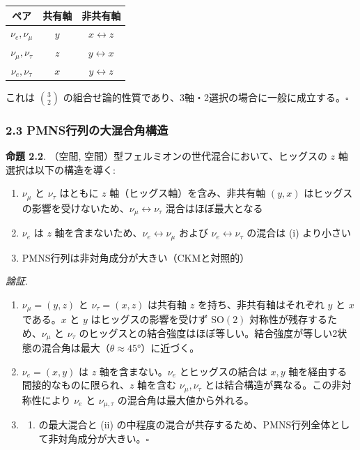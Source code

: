 \documentclass[
  a4paper,11pt]{ltjsarticle}
\newcounter{none} %
\providecommand{\tightlist}{%
  \setlength{\itemsep}{0pt}\setlength{\parskip}{0pt}}
\begin{document}
{\def\LTcaptype{none} %
\begin{longtable}[]{@{}ccc@{}}
\toprule\noalign{}
ペア & 共有軸 & 非共有軸 \\
\midrule\noalign{}
\endhead
\bottomrule\noalign{}
\endlastfoot
\(\nu_e, \nu_\mu\) & \(y\) & \(x \leftrightarrow z\) \\
\(\nu_\mu, \nu_\tau\) & \(z\) & \(y \leftrightarrow x\) \\
\(\nu_e, \nu_\tau\) & \(x\) & \(y \leftrightarrow z\) \\
\end{longtable}
}

これは \(\binom{3}{2}\)
の組合せ論的性質であり、3軸・2選択の場合に一般に成立する。\(\square\)

\subsubsection{2.3
PMNS行列の大混合角構造}\label{pmnsux884cux5217ux306eux5927ux6df7ux5408ux89d2ux69cbux9020}

\textbf{命題 2.2}. （空間,
空間）型フェルミオンの世代混合において、ヒッグスの \(z\)
軸選択は以下の構造を導く:

\begin{enumerate}
\def\labelenumi{(\roman{enumi})}
\item
  \(\nu_\mu\) と \(\nu_\tau\) はともに \(z\)
  軸（ヒッグス軸）を含み、非共有軸 \((y, x)\)
  はヒッグスの影響を受けないため、\(\nu_\mu \leftrightarrow \nu_\tau\)
  混合はほぼ最大となる
\item
  \(\nu_e\) は \(z\) 軸を含まないため、\(\nu_e \leftrightarrow \nu_\mu\)
  および \(\nu_e \leftrightarrow \nu_\tau\) の混合は (i) より小さい
\item
  PMNS行列は非対角成分が大きい（CKMと対照的）
\end{enumerate}

\emph{論証}.

\begin{enumerate}
\def\labelenumi{(\roman{enumi})}
\item
  \(\nu_\mu = (y, z)\) と \(\nu_\tau = (x, z)\) は共有軸 \(z\)
  を持ち、非共有軸はそれぞれ \(y\) と \(x\) である。\(x\) と \(y\)
  はヒッグスの影響を受けず \(\mathrm{SO}(2)\)
  対称性が残存するため、\(\nu_\mu\) と \(\nu_\tau\)
  のヒッグスとの結合強度はほぼ等しい。結合強度が等しい2状態の混合角は最大（\(\theta \approx 45°\)）に近づく。
\item
  \(\nu_e = (x, y)\) は \(z\) 軸を含まない。\(\nu_e\) とヒッグスの結合は
  \(x, y\) 軸を経由する間接的なものに限られ、\(z\) 軸を含む
  \(\nu_\mu, \nu_\tau\) とは結合構造が異なる。この非対称性により
  \(\nu_e\) と \(\nu_{\mu,\tau}\) の混合角は最大値から外れる。
\item
  \begin{enumerate}
  \def\labelenumii{(\roman{enumii})}
  \tightlist
  \item
    の最大混合と (ii)
    の中程度の混合が共存するため、PMNS行列全体として非対角成分が大きい。\(\square\)
  \end{enumerate}
\end{enumerate}
\end{document}
